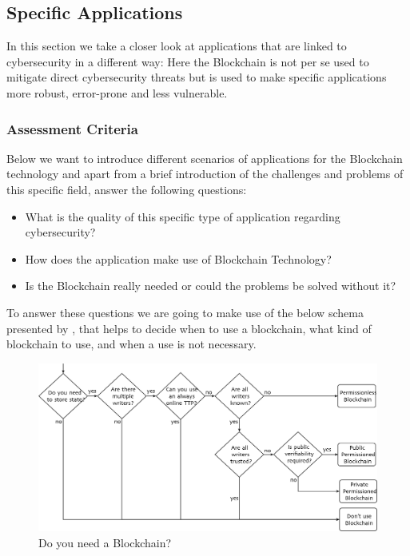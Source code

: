 \subsection{Specific Applications}
\label{subsec:03_applications}

In this section we take a closer look at applications that are linked to cybersecurity in a different way: Here the Blockchain is not per se used to mitigate direct cybersecurity threats but is used to make specific applications more robust, error-prone and less vulnerable.

\subsubsection{Assessment Criteria}
Below we want to introduce different scenarios of applications for the Blockchain technology and apart from a brief introduction of the challenges and problems of this specific field, answer the following questions:
\begin{itemize}
	\item What is the quality of this specific type of application regarding cybersecurity?
	\item How does the application make use of Blockchain Technology?
	\item Is the Blockchain really needed or could the problems be solved without it?
\end{itemize}
To answer these questions we are going to make use of the below schema presented by \citeauthor{Wust2017}, that helps to decide when to use a blockchain, what kind of blockchain to use, and when a use is not necessary.
\begin{figure}[ht!]
	\begin{center}
		\includegraphics[scale=0.6]{Talk7/img/app/BCorNot}
	\end{center}
	\caption{Do you need a Blockchain?}
	\label{blockchain_or_not}
\end{figure}

